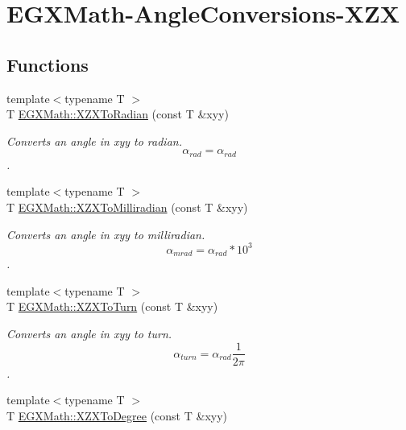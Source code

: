 \hypertarget{group___e_g_x_math-_angle_conversions-_x_z_x}{}\section{E\+G\+X\+Math-\/\+Angle\+Conversions-\/\+X\+ZX}
\label{group___e_g_x_math-_angle_conversions-_x_z_x}
\subsection*{Functions}
\begin{DoxyCompactItemize}
\item 
{\footnotesize template$<$typename T $>$ }\\T \mbox{\hyperlink{group___e_g_x_math-_angle_conversions-_x_z_x_gad7d309239e80a848c661919f71fc22bd}{E\+G\+X\+Math\+::\+X\+Z\+X\+To\+Radian}} (const T \&xyy)
\begin{DoxyCompactList}\small\item\em Converts an angle in xyy to radian. \[\alpha_{rad}=\alpha_{rad}\]. \end{DoxyCompactList}\item 
{\footnotesize template$<$typename T $>$ }\\T \mbox{\hyperlink{group___e_g_x_math-_angle_conversions-_x_z_x_gadbd00eddee5bd9ee313fabb1a9d3ff3c}{E\+G\+X\+Math\+::\+X\+Z\+X\+To\+Milliradian}} (const T \&xyy)
\begin{DoxyCompactList}\small\item\em Converts an angle in xyy to milliradian. \[\alpha_{mrad}=\alpha_{rad}*10^3\]. \end{DoxyCompactList}\item 
{\footnotesize template$<$typename T $>$ }\\T \mbox{\hyperlink{group___e_g_x_math-_angle_conversions-_x_z_x_ga8b1f4d603c32f02c0fe8b21e5c14d292}{E\+G\+X\+Math\+::\+X\+Z\+X\+To\+Turn}} (const T \&xyy)
\begin{DoxyCompactList}\small\item\em Converts an angle in xyy to turn. \[\alpha_{turn}=\alpha_{rad}\frac{1}{2 \pi}\]. \end{DoxyCompactList}\item 
{\footnotesize template$<$typename T $>$ }\\T \mbox{\hyperlink{group___e_g_x_math-_angle_conversions-_x_z_x_gaf91d111a3f3558dcd147d3832afc1fd6}{E\+G\+X\+Math\+::\+X\+Z\+X\+To\+Degree}} (const T \&xyy)

\end{DoxyCompactItemize}
